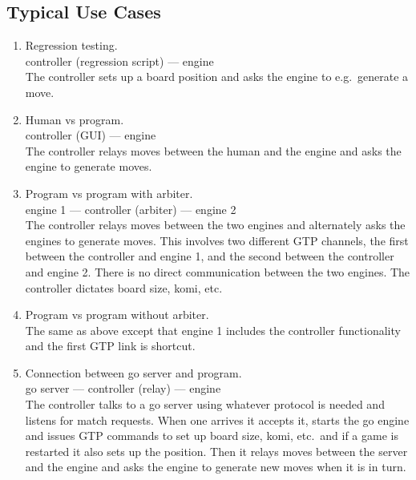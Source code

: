 \documentclass[a4paper]{article}
\begin{document}
\subsection{Typical Use Cases}
\begin{enumerate}
\item Regression testing. \\
  controller (regression script) --- engine \\
  The controller sets up a board position and asks the engine to e.g.\ 
  generate a move.
  
\item Human vs program. \\
  controller (GUI) --- engine \\
  The controller relays moves between the human and the engine and
  asks the engine to generate moves.
  
\item Program vs program with arbiter. \\
  engine 1 --- controller (arbiter) --- engine 2 \\
  The controller relays moves between the two engines and alternately
  asks the engines to generate moves. This involves two different GTP
  channels, the first between the controller and engine 1, and the
  second between the controller and engine 2. There is no direct
  communication between the two engines. The controller dictates board
  size, komi, etc.
    
\item Program vs program without arbiter. \\
  The same as above except that engine 1 includes the controller
  functionality and the first GTP link is shortcut.
    
\item Connection between go server and program. \\
  go server --- controller (relay) --- engine \\
  The controller talks to a go server using whatever protocol is
  needed and listens for match requests. When one arrives it accepts
  it, starts the go engine and issues GTP commands to set up board
  size, komi, etc.\ and if a game is restarted it also sets up the
  position. Then it relays moves between the server and the engine and
  asks the engine to generate new moves when it is in turn.
\end{enumerate}

\end{document}

